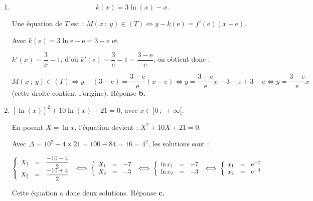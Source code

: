 \documentclass[10pt]{article}
\providecommand{\R}{\mathbb{R}}
\providecommand{\e}{{\mathrm{e}}}
\begin{document}
\begin{enumerate}
La fonction $h$ produit de fonctions dérivables sur $\R$ est dérivable et pour tout réel :

$h'(x) = 4\e^{2x} + 2(4x - 16)\e^{2x} = \e^{2x}(4 + 8x - 32) = \e^{2x}(8x - 28)$.

$h''(x) = 8\e^{2x} + 2(8x - 28)\e^{2x} = \e^{2x}(8 + 16x  - 56) = \e^{2x}(16x - 48) = 16\e^{2x}(x - 3)$.

Comme $4\e^{2x} > 0$ quel que soit le réel $x$, le signe de $h''(x)$ est celui de $x - 3$.

Donc la dérivée seconde s'annule en $x = 3$ en changeant de signe, donc le point de coordonnées $\left(3~;~-4\text{e}^{6}\right)$ est le seul point d'inflexion de la courbe $\mathcal{C}_h$. Réponse \textbf{b.}

\item 
\[k(x) = 3 \ln (x) - x.\]





Une équation de $T$ est : $M(x~;~y) \in (T) \iff y - k(\e) = f'(\e)(x- \e)$.

Avec $k(\e) = 3\ln \e - \e = 3 - \e$ et 

$k'(x) = \dfrac 3x - 1$, d'où $k'(\e) = \dfrac{3}{\e} - 1 = \dfrac{3 - \e}{\e}$, on obtient donc :

$M(x~;~y) \in (T) \iff y - (3 - \e) = \dfrac{3 - \e}{\e}(x- \e) \iff y  = \dfrac{3 - \e}{\e}x - 3 + \e  + 3 - \e \iff y = \dfrac{3 - \e}{\e}x$ (cette droite contient l'origine). Réponse \textbf{b.}







\item 
$[\ln (x)]^2 + 10 \ln (x) + 21 = 0$, avec $x \in ]0~;~+\infty[$.







En posant $X = \ln x$, l'équation devient : $X^2 + 10X + 21 = 0$.

Avec $\Delta = 10^2 - 4\times 21 = 100 - 84 = 16 = 4^2$, les solutions sont :

$\left\{\begin{array}{l c l}
X_1 &=&\dfrac{-10 - 4}{2}\\
X_2&=&\dfrac{-10 + 4}{2}
\end{array}\right. \iff 
\left\{\begin{array}{l c l}
X_1 &=&- 7\\
X_2&=&- 3
\end{array}\right. \iff \left\{\begin{array}{l c l}
\ln x_1 &=&-7\\
\ln x_2&=&-3
\end{array}\right. \iff 
\left\{\begin{array}{l c l}
x_1 &=&\e^{-7}\\
x_2&=&\e^{-3}
\end{array}\right.$

Cette équation a donc deux solutions. Réponse \textbf{c.}
\end{enumerate}
\end{document}
